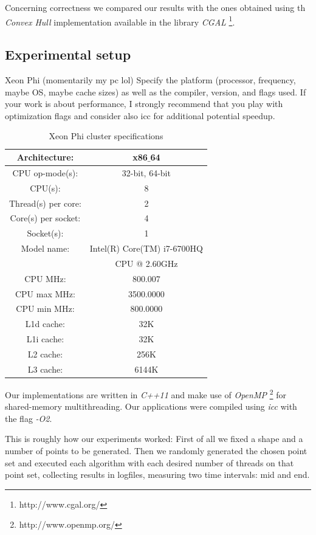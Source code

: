 \documentclass[letterpaper]{article}
\begin{document}
Concerning correctness we compared our results with the ones obtained using th \textit{Convex Hull} implementation available in the library \textit{CGAL} \footnote{http://www.cgal.org/}.

\subsection{Experimental setup}

Xeon Phi (momentarily my pc lol)
 Specify the platform (processor, frequency, maybe OS, maybe cache sizes)
as well as the compiler, version, and flags used. If your work is about performance, 
I strongly recommend that you play with optimization flags and consider also icc for additional potential speedup.
\begin{table}[!ht]
\begin{tabular}{|c|c|}
\hline Architecture: 		 & x86$\_$64\\
\hline CPU op-mode(s):        & 32-bit, 64-bit\\
\hline CPU(s):                & 8\\
\hline Thread(s) per core:    & 2\\
\hline Core(s) per socket:    & 4\\
\hline Socket(s):             & 1\\
\hline Model name:            & Intel(R) Core(TM) i7-6700HQ\\							 & CPU @ 2.60GHz\\
\hline CPU MHz:               & 800.007\\
\hline CPU max MHz:           & 3500.0000\\
\hline CPU min MHz:           & 800.0000\\
\hline L1d cache:             & 32K\\
\hline L1i cache:             & 32K\\
\hline L2 cache:              & 256K\\
\hline L3 cache:              & 6144K\\
\hline
\end{tabular}
\caption{Xeon Phi cluster specifications}
\end{table}

Our implementations are written in \textit{C++11} and make use of \textit{OpenMP} \footnote{http://www.openmp.org/} for shared-memory multithreading.
Our applications were compiled using \textit{icc} with the flag \textit{-O2}.

This is roughly how our experiments worked:
First of all we fixed a shape and a number of points to be generated. Then we randomly generated the chosen point set and executed each algorithm with each desired number of threads on that point set, collecting results in logfiles, measuring two time intervals: mid and end.
\end{document}
